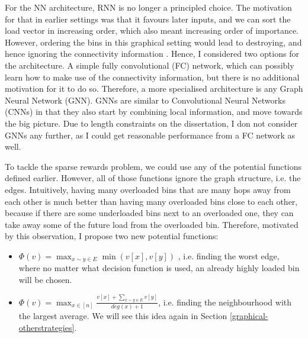 For the NN architecture, RNN is no longer a principled choice. The motivation for that in earlier settings was that it favours later inputs, and we can sort the load vector in increasing order, which also meant increasing order of importance. However, ordering the bins in this graphical setting would lead to destroying, and hence ignoring the connectivity information . Hence, I considered two options for the architecture. A simple fully convolutional (FC) network, which can possibly learn how to make use of the connectivity information, but there is no additional motivation for it to do so. Therefore, a more specialised architecture is any Graph Neural Network (GNN). GNNs are similar to Convolutional Neural Networks (CNNs) in that they also start by combining local information, and move towards the big picture. Due to length constraints on the dissertation, I don not consider GNNs any further, as I could get reasonable performance from a FC network as well. 



To tackle the sparse rewards problem, we could use any of the potential functions defined earlier. However, all of those functions ignore the graph structure, i.e. the edges. Intuitively, having many overloaded bins that are many hops away from each other is much better than having many overloaded bins close to each other, because if there are some underloaded bins next to an overloaded one, they can take away some of the future load from the overloaded bin. Therefore, motivated by this observation, I propose two new potential functions:


\begin{itemize}
    \item 
    $\Phi(v)=\max_{x\sim y \in E} \min(v[x], v[y])$ , i.e. finding the worst edge, where no matter what decision function is used, an already highly loaded bin will be chosen.
    \item
    $\Phi(v)=\max_{x \in [n]} \frac{v[x]+\sum_{x\sim y \in E}v[y]}{deg(x)+1}$, i.e. finding the neighbourhood with the largest average. We will see this idea again in Section \ref{graphical-otherstrategies}.
\end{itemize}

